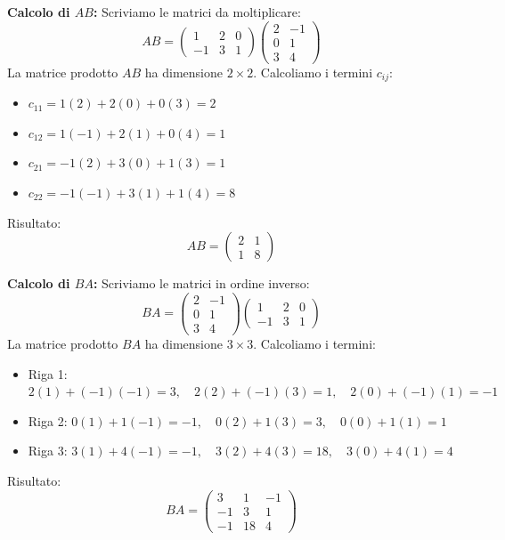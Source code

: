 \begin{solbox}
\textbf{Calcolo di $AB$:}
Scriviamo le matrici da moltiplicare:
$$ AB = \begin{pmatrix} 1 & 2 & 0 \\ -1 & 3 & 1 \end{pmatrix} \begin{pmatrix} 2 & -1 \\ 0 & 1 \\ 3 & 4 \end{pmatrix} $$
La matrice prodotto $AB$ ha dimensione $2 \times 2$. Calcoliamo i termini $c_{ij}$:
\begin{itemize}
    \item $c_{11} = 1(2) + 2(0) + 0(3) = 2$
    \item $c_{12} = 1(-1) + 2(1) + 0(4) = 1$
    \item $c_{21} = -1(2) + 3(0) + 1(3) = 1$
    \item $c_{22} = -1(-1) + 3(1) + 1(4) = 8$
\end{itemize}
Risultato:
$$ AB = \begin{pmatrix} 2 & 1 \\ 1 & 8 \end{pmatrix} $$

\textbf{Calcolo di $BA$:}
Scriviamo le matrici in ordine inverso:
$$ BA = \begin{pmatrix} 2 & -1 \\ 0 & 1 \\ 3 & 4 \end{pmatrix} \begin{pmatrix} 1 & 2 & 0 \\ -1 & 3 & 1 \end{pmatrix} $$
La matrice prodotto $BA$ ha dimensione $3 \times 3$. Calcoliamo i termini:
\begin{itemize}
    \item Riga 1: $2(1)+(-1)(-1)=3, \quad 2(2)+(-1)(3)=1, \quad 2(0)+(-1)(1)=-1$
    \item Riga 2: $0(1)+1(-1)=-1, \quad 0(2)+1(3)=3, \quad 0(0)+1(1)=1$
    \item Riga 3: $3(1)+4(-1)=-1, \quad 3(2)+4(3)=18, \quad 3(0)+4(1)=4$
\end{itemize}
Risultato:
$$ BA = \begin{pmatrix} 3 & 1 & -1 \\ -1 & 3 & 1 \\ -1 & 18 & 4 \end{pmatrix} $$
\end{solbox}

